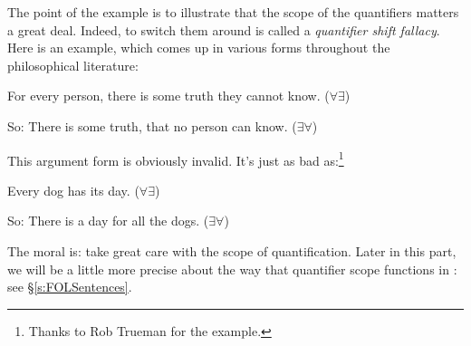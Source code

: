 The point of the example is to illustrate that the scope of the quantifiers matters a great deal. Indeed, to switch them around is called a \emph{quantifier shift fallacy}. Here is an example, which comes up in various forms throughout the philosophical literature:
	\begin{earg}
		\item[] For every person, there is some truth they cannot know. \hfill ($\forall \exists$)
		\item[So:] There is some truth, that no person can know. \hfill ($\exists \forall$)
	\end{earg}
This argument form is obviously invalid. It's just as bad as:\footnote{Thanks to Rob Trueman for the example.}
	\begin{earg}
		\item[] Every dog has its day. \hfill ($\forall \exists$)
		\item[So:] There is a day for all the dogs. \hfill ($\exists \forall$)
	\end{earg}
The moral is: take great care with the scope of quantification. Later in this part, we will be a little more precise about the way that quantifier scope functions in \FOL: see §\ref{s:FOLSentences}. 



